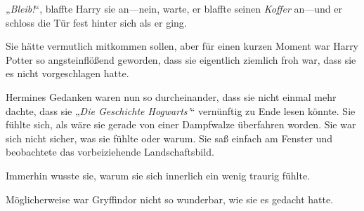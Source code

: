 „\emph{Bleib!}“, blaffte Harry sie an—nein, warte, er blaffte seinen \emph{Koffer} an—und er schloss die Tür fest hinter sich als er ging.

Sie hätte vermutlich mitkommen sollen, aber für einen kurzen Moment war Harry Potter so angsteinflößend geworden, dass sie eigentlich ziemlich froh war, dass sie es nicht vorgeschlagen hatte.

Hermines Gedanken waren nun so durcheinander, dass sie nicht einmal mehr dachte, dass sie „\emph{Die Geschichte Hogwarts’}“ vernünftig zu Ende lesen könnte. Sie fühlte sich, als wäre sie gerade von einer Dampfwalze überfahren worden. Sie war sich nicht sicher, was sie fühlte oder warum. Sie saß einfach am Fenster und beobachtete das vorbeiziehende Landschaftsbild.

Immerhin wusste sie, warum sie sich innerlich ein wenig traurig fühlte.

Möglicherweise war Gryffindor nicht so wunderbar, wie sie es gedacht hatte.


